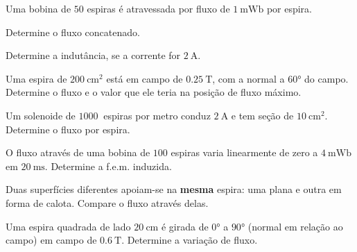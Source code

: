 \blocoaplicacao
\begin{questao}[2]{}

Uma bobina de $50$ espiras é atravessada por fluxo de
$\SI{1}{\milli\weber}$ por espira.
\begin{itensq}
\item Determine o fluxo concatenado.
\item Determine a indutância, se a corrente for $\SI{2}{\ampere}$.
\end{itensq}


\end{questao}
\begin{questao}[2]{}

Uma espira de $\SI{200}{\centi\meter\squared}$ está em campo de
$\SI{0.25}{\tesla}$, com a normal a $\ang{60}$ do campo. Determine o fluxo e o
valor que ele teria na posição de fluxo máximo.


\end{questao}
\begin{questao}[2]{}

Um solenoide de $\SI{1000}{}$ espiras por metro conduz $\SI{2}{\ampere}$ e tem
seção de $\SI{10}{\centi\meter\squared}$. Determine o fluxo por espira.


\end{questao}
\begin{questao}[2]{}

O fluxo através de uma bobina de $100$ espiras varia linearmente de zero a
$\SI{4}{\milli\weber}$ em $\SI{20}{\milli\second}$. Determine a f.e.m.
induzida.


\end{questao}
\begin{questao}[2]{}

Duas superfícies diferentes apoiam-se na \textbf{mesma} espira: uma plana e
outra em forma de calota. Compare o fluxo através delas.


\end{questao}
\begin{questao}[2]{}

Uma espira quadrada de lado $\SI{20}{\centi\meter}$ é girada de
$\ang{0}$ a $\ang{90}$ (normal em relação ao campo) em campo de
$\SI{0.6}{\tesla}$. Determine a variação de fluxo.


\end{questao}
